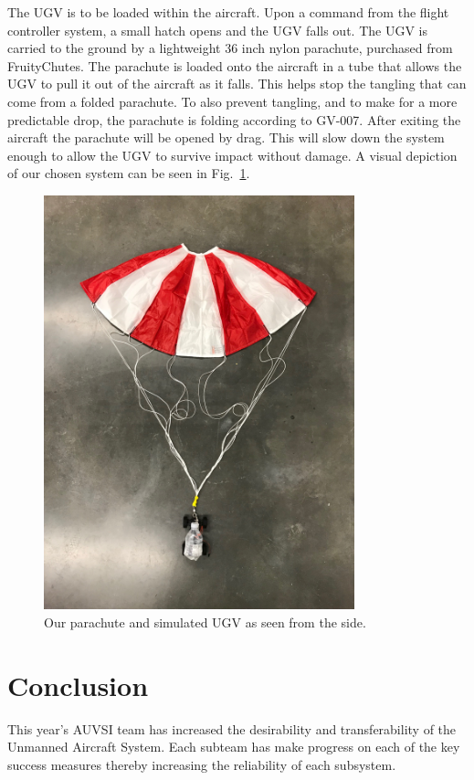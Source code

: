 \documentclass[]{auvsi_doc}
\begin{document}
The UGV is to be loaded within the aircraft. Upon a command from the flight controller system, a small hatch opens and the UGV falls out. The UGV is carried to the ground by a lightweight 36 inch nylon parachute, purchased from FruityChutes. The parachute is loaded onto the aircraft in a tube that allows the UGV to pull it out of the aircraft as it falls. This helps stop the tangling that can come from a folded parachute. To also prevent tangling, and to make for a more predictable drop, the parachute is folding according to GV-007. After exiting the aircraft the parachute will be opened by drag. This will slow down the system enough to allow the UGV to survive impact without damage. A visual depiction of our chosen system can be seen in Fig.~\ref{fig:side}.

\begin{figure}[h]
\centering
\includegraphics[width=90mm]{./figs/Parachute_Side.jpg}
\caption{Our parachute and simulated UGV as seen from the side.}
\label{fig:side}
\end{figure}

\section{Conclusion}

This year's AUVSI team has increased the desirability and transferability of the Unmanned Aircraft System. Each subteam
has make progress on each of the key success measures thereby increasing the reliability of each subsystem.
\end{document}
